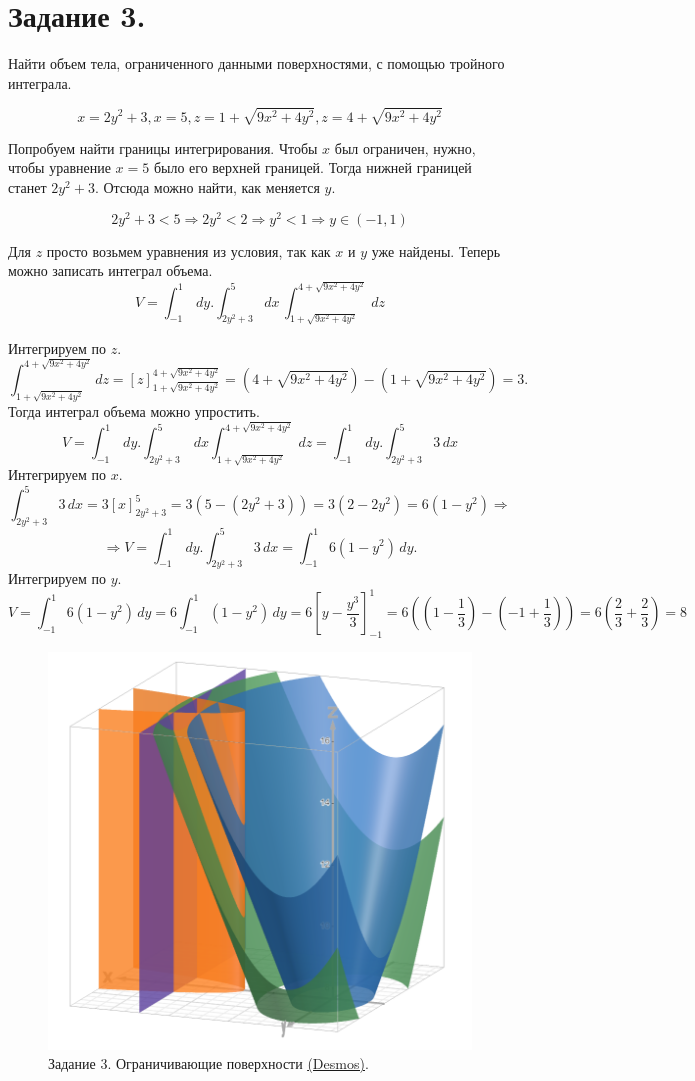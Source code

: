 \newpage
\section{Задание 3.}

Найти объем тела, ограниченного данными поверхностями, с помощью тройного интеграла.

$$x = 2y^2 + 3, x = 5, z = 1 + \sqrt{9x^2 + 4y^2}, z = 4 + \sqrt{9x^2 + 4y^2}$$

Попробуем найти границы интегрирования. Чтобы $x$ был ограничен, нужно, чтобы уравнение $x=5$ было его верхней границей. Тогда нижней границей станет $2y^2+3$. Отсюда можно найти, как меняется $y$. 

$$2y^2 + 3 < 5 \Rightarrow 2y^2 < 2 \Rightarrow y^2 < 1 \Rightarrow y\in(-1,1)$$

Для $z$ просто возьмем уравнения из условия, так как $x$ и $y$ уже найдены. Теперь можно записать интеграл объема.
$$V = \int_{-1}^{1}\,  dy. \int_{2y^2+3}^{5} dx \,\int_{1+\sqrt{9x^2+4y^2}}^{4+\sqrt{9x^2+4y^2}} \, dz $$
\begin{center}
Интегрируем по $z$.
$$ \int_{1+\sqrt{9x^2+4y^2}}^{4+\sqrt{9x^2+4y^2}} dz = [z]_{1+\sqrt{9x^2+4y^2}}^{4+\sqrt{9x^2+4y^2}} = (4+\sqrt{9x^2+4y^2}) - (1+\sqrt{9x^2+4y^2}) = 3.$$
Тогда интеграл объема можно упростить.
$$V = \int_{-1}^{1}\,  dy. \int_{2y^2+3}^{5} \,dx \int_{1+\sqrt{9x^2+4y^2}}^{4+\sqrt{9x^2+4y^2}} \, dz  = \int_{-1}^{1}\,  dy. \int_{2y^2+3}^{5} 3 \,dx $$
Интегрируем по $x$.
$$\int_{2y^2+3}^{5} 3 \, dx = 3 \left[ x \right]_{2y^2+3}^{5} = 3 \left( 5 - (2y^2 + 3) \right) = 3(2 - 2y^2) = 6(1 - y^2) \Rightarrow$$
$$\Rightarrow V = \int_{-1}^{1}\,  dy. \int_{2y^2+3}^{5} 3 \,dx = \int_{-1}^{1} 6(1 - y^2) \,dy. $$
Интегрируем по $y$.
$$V = \int_{-1}^{1} 6(1-y^2) \, dy = 6 \int_{-1}^{1} (1-y^2) \, dy = 6 \left[ y - \frac{y^3}{3} \right]_{-1}^{1} = 6 \left( \left(1 - \frac{1}{3}\right) - \left(-1 + \frac{1}{3}\right) \right) = 6 \left( \frac{2}{3} + \frac{2}{3}\right) = \boxed{8}$$
\end{center}


\begin{figure}[h!t]
    \centering
    \includegraphics[width=0.4\linewidth]{Task3/Figure_outer_shapes.png}
    \caption{Задание 3. Ограничивающие поверхности \underline{\href{https://www.desmos.com/3D/kl5guofsih}{(Desmos)}}. }
\end{figure}
\newpage

